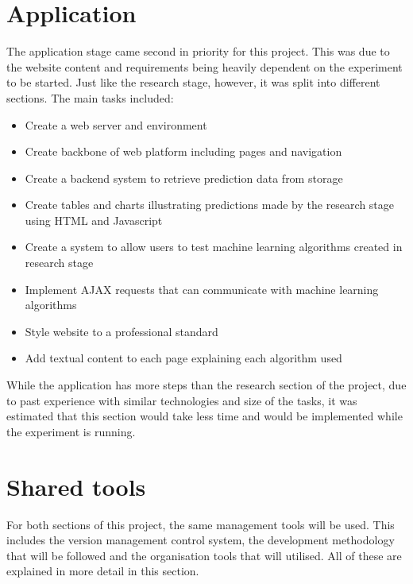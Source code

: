 \documentclass[a4paper,11pt]{report}
\begin{document}
\section{Application}
The application stage came second in priority for this project. This was due to the website content and requirements being heavily dependent on the experiment to be started. Just like the research stage, however, it was split into different sections. The main tasks included:

\begin{itemize}
    \item{Create a web server and environment}
    \item{Create backbone of web platform including pages and navigation}
    \item{Create a backend system to retrieve prediction data from storage}
    \item{Create tables and charts illustrating predictions made by the research stage using HTML and Javascript}
    \item{Create a system to allow users to test machine learning algorithms created in research stage}
    \item{Implement AJAX requests that can communicate with machine learning algorithms}
    \item{Style website to a professional standard}
    \item{Add textual content to each page explaining each algorithm used}
\end{itemize}

While the application has more steps than the research section of the project, due to past experience with similar technologies and size of the tasks, it was estimated that this section would take less time and would be implemented while the experiment is running.

\section{Shared tools}
For both sections of this project, the same management tools will be used. This includes the version management control system, the development methodology that will be followed and the organisation tools that will utilised. All of these are explained in more detail in this section.
\end{document}
